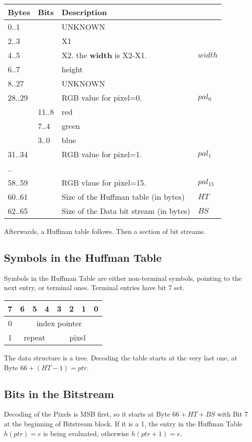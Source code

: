 \documentclass[11pt,twoside,openright]{report}
\begin{document}
\begin{tabular}{l|l|ll}
Bytes&Bits&Description\\\hline
0..1&&UNKNOWN\\
2..3&&X1\\
4..5&&X2. the {\bf width} is X2-X1.&$width$\\
6..7&&height\\
8..27&&UNKNOWN\\
28..29&&RGB value for pixel=0.&$pal_0$\\
&11..8&red\\
&7..4&green\\
&3..0&blue\\
31..34&&RGB value for pixel=1.&$pal_1$\\
..&&&\\
58..59&&RGB vlaue for pixel=15.&$pal_{15}$\\
60..61&&Size of the Huffman table (in bytes)&$HT$\\
62..65&&Size of the Data bit stream (in bytes)&$BS$\\\hline
\end{tabular}

Afterwards, a Huffman table follows. Then a section of bit streams.\\
\subsection{Symbols in the Huffman Table}
Symbols in the Huffman Table are either non-terminal symbols, pointing to the next entry, or terminal ones. Terminal entries have bit 7 set.\\
\begin{tabular}{|c|c|c|c|c|c|c|c|}
\tiny 7&\tiny 6&\tiny 5&\tiny 4&\tiny 3&\tiny 2&\tiny 1&\tiny 0\\\hline
0&\multicolumn{7}{c|}{index pointer}\\\hline
1&\multicolumn{3}{c|}{repeat}&\multicolumn{4}{c|}{pixel}\\\hline
\end{tabular}

The data structure is a tree. Decoding the table starts at the very last one, at Byte $66+(HT-1)=ptr$. 

\subsection{Bits in the Bitstream}
Decoding of the Pixels is MSB first, so it starts at Byte $66+HT+BS$ with Bit 7 at the beginning of Bitstream block. If it is a 1, the entry in the Huffman Table $h(ptr)=e$ is being evaluated, otherwise $h(ptr+1)=e$.
\end{document}
